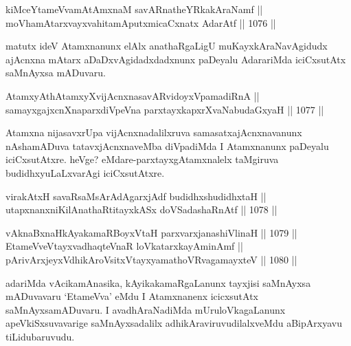 
\begin{shl}
kiMceYtameVvamAtAmxnaM savARnatheYRkakAraNamf || \\
moVhamAtarxvayxvahitamAputxmicaCxnatx AdarAtf \hfill || 1076 ||  
\end{shl}

\begin{artha}
matutx ideV Atamxnanunx elAlx anathaRgaLigU muKayxkAraNavAgidudx ajAcnxna mAtarx aDaDxvAgidadxdadxnunx paDeyalu AdarariMda iciCxsutAtx saMnAyxsa mADuvaru.
\end{artha}


\begin{shl}
AtamxyAthAtamxyXvijAcnxnasavARvidoyxVpamadiRnA || \\
samayxgajxcnXnaparxdiVpeVna parxtayxkapxrXvaNabudaGxyaH \hfill || 1077 ||  
\end{shl}

\begin{artha}
Atamxna nijasavxrUpa vijAcnxnadalilxruva samasatxajAcnxnavanunx nAshamADuva tatavxjAcnxnaveMba diVpadiMda I Atamxnanunx paDeyalu iciCxsutAtxre. heVge? eMdare-parxtayxgAtamxnalelx taMgiruva budidhxyuLaLxvarAgi iciCxsutAtxre.
\end{artha}

\begin{shl}
virakAtxH savaRsaMsArAdAgarxjAdf budidhxshudidhxtaH || \\
utapxnanxniKilAnathaRtitayxkASx doVSadashaRnAtf \hfill || 1078 ||  
\end{shl}
				
\begin{shl}
vAknaBxnaHkAyakamaRBoyxV\s taH parxvarxjanashiVlinaH \hfill || 1079 ||  \\
EtameVveVtayxvadhaqteVnaR loVkatarxkayAminAmf || \\
pArivArxjeyxV\s dhikAroV\s sitxVtayxyamathoVR\s vagamayxteV \hfill || 1080 ||  
\end{shl}

\begin{artha}
adariMda vAcikamAnasika, kAyikakamaRgaLanunx tayxjisi saMnAyxsa mADuvavaru `EtameVva' eMdu I Atamxnanenx icicxsutAtx saMnAyxsamADuvaru. I avadhAraNadiMda mUruloVkagaLanunx apeVkiSxsuvavarige saMnAyxsadalilx adhikAraviruvudilalxveMdu aBipArxyavu tiLidubaruvudu.
\end{artha}

